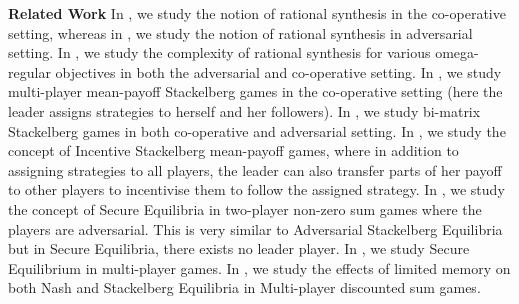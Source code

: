 \textbf{Related Work} In \cite{FKL10}, we study the notion of rational synthesis in the co-operative setting, whereas in \cite{KPV16}, we study the notion of rational synthesis in adversarial setting. In \cite{CFGR16}, we study the complexity of rational synthesis for various omega-regular objectives in both the adversarial and co-operative setting. In \cite{GS14}, we study multi-player mean-payoff Stackelberg games in the co-operative setting (here the leader assigns strategies to herself and her followers). In \cite{GS18}, we study bi-matrix Stackelberg games in both co-operative and adversarial setting. In \cite{GSTDP16}, we study the concept of Incentive Stackelberg mean-payoff games, where in addition to assigning strategies to all players, the leader can also transfer parts of her payoff to other players to incentivise them to follow the assigned strategy. In \cite{CHJ06}, we study the concept of Secure Equilibria in two-player non-zero sum games where the players are adversarial.  This is very similar to Adversarial Stackelberg Equilibria but in Secure Equilibria, there exists no leader player.  In \cite{PFKSV14}, we study Secure Equilibrium in multi-player games.  In \cite{GS15}, we study the effects of limited memory on both Nash and Stackelberg Equilibria in Multi-player discounted sum games.


